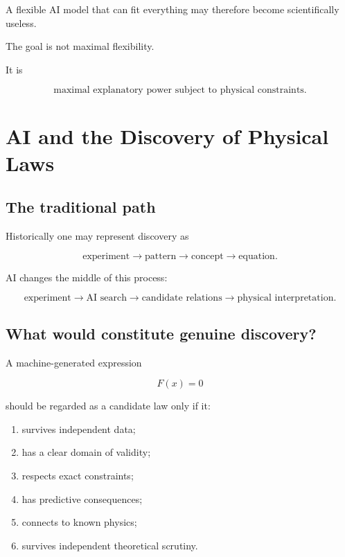 \documentclass[11pt,a4paper,oneside]{book}
\begin{document}
A flexible AI model that can fit everything may therefore become scientifically
useless.

The goal is not maximal flexibility.

It is

\begin{equation}
\boxed{
\text{maximal explanatory power subject to physical constraints}.
}
\end{equation}

\chapter{AI and the Discovery of Physical Laws}

\section{The traditional path}

Historically one may represent discovery as

\begin{equation}
\text{experiment}
\rightarrow
\text{pattern}
\rightarrow
\text{concept}
\rightarrow
\text{equation}.
\end{equation}

AI changes the middle of this process:

\begin{equation}
\text{experiment}
\rightarrow
\text{AI search}
\rightarrow
\text{candidate relations}
\rightarrow
\text{physical interpretation}.
\end{equation}

\section{What would constitute genuine discovery?}

A machine-generated expression

\begin{equation}
F(x)=0
\end{equation}

should be regarded as a candidate law only if it:

\begin{enumerate}
\item survives independent data;
\item has a clear domain of validity;
\item respects exact constraints;
\item has predictive consequences;
\item connects to known physics;
\item survives independent theoretical scrutiny.
\end{enumerate}
\end{document}
